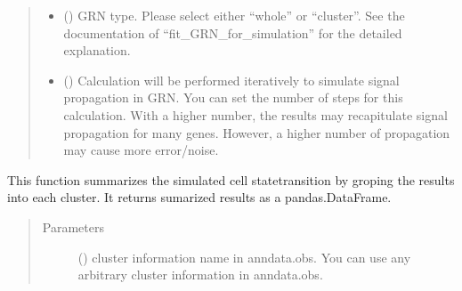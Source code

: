 \documentclass[letterpaper,10pt,english]{sphinxmanual}
\begin{document}
\begin{fulllineitems}
\begin{fulllineitems}
\begin{quote}
\begin{description}
\begin{itemize}
\item {} 
 () \textendash{} GRN type. Please select either “whole” or “cluster”. See the documentation of “fit\_GRN\_for\_simulation” for the detailed explanation.

\item {} 
 () \textendash{} Calculation will be performed iteratively to simulate signal propagation in GRN.
You can set the number of steps for this calculation.
With a higher number, the results may recapitulate signal propagation for many genes.
However, a higher number of propagation may cause more error/noise.

\end{itemize}

\end{description}\end{quote}

\end{fulllineitems}


\begin{fulllineitems}
\label{\detokenize{modules/celloracle:celloracle.Oracle.summarize_mc_results_by_cluster}}
This function summarizes the simulated cell state\sphinxhyphen{}transition by groping the results into each cluster.
It returns sumarized results as a pandas.DataFrame.
\begin{quote}\begin{description}
\item[{Parameters}] \leavevmode
{} () \textendash{} cluster information name in anndata.obs.
You can use any arbitrary cluster information in anndata.obs.

\end{description}\end{quote}

\end{fulllineitems}


\end{fulllineitems}
\end{document}
